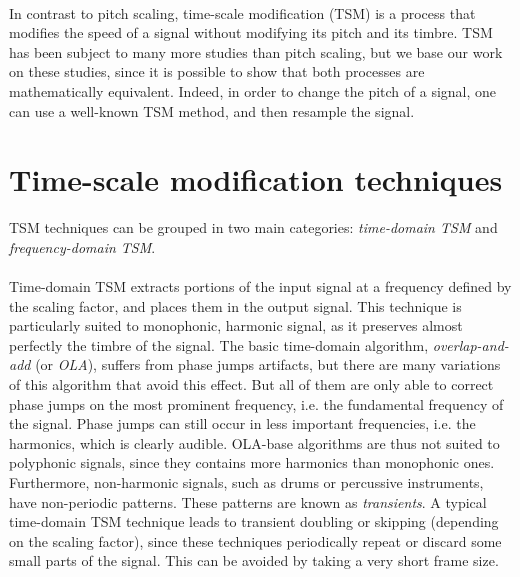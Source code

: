 \documentclass[letterpaper]{article}
\begin{document}
\paragraph{}
In contrast to pitch scaling, time-scale modification (TSM) is a process that
modifies the speed of a signal without modifying its pitch and its timbre.
TSM has been subject to many more studies than pitch scaling, but we base our
work on these studies, since it is possible to show that both processes are
mathematically equivalent. Indeed, in order to change the pitch of a signal, one
can use a well-known TSM method, and then resample the signal.

\section{Time-scale modification techniques}
TSM techniques can be grouped in two main categories: \emph{time-domain TSM} and
\emph{frequency-domain TSM}.

\paragraph{}
Time-domain TSM extracts portions of the input signal at a frequency defined by
the scaling factor, and places them in the output signal. This technique is
particularly suited to monophonic, harmonic signal, as it preserves almost
perfectly the timbre of the signal. The basic time-domain algorithm,
\emph{overlap-and-add} (or \emph{OLA}), suffers from phase jumps artifacts, but
there are many variations of this algorithm that avoid this effect. But all of
them are only able to correct phase jumps on the most prominent frequency, i.e.
the fundamental frequency of the signal. Phase jumps can still occur in less
important frequencies, i.e. the harmonics, which is clearly audible. OLA-base
algorithms are thus not suited to polyphonic signals, since they contains more
harmonics than monophonic ones. Furthermore, non-harmonic signals, such as drums
or percussive instruments, have non-periodic patterns. These patterns are known
as \emph{transients}. A typical time-domain TSM technique leads to transient
doubling or skipping (depending on the scaling factor), since these techniques
periodically repeat or discard some small parts of the signal. This can be
avoided by taking a very short frame size.
\end{document}
